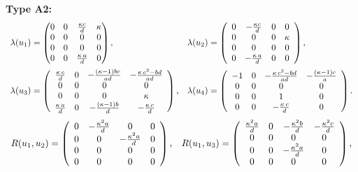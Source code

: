 \documentclass{amsart}
\theoremstyle{plain}
\theoremstyle{remark}
\begin{document}
{\smallskip\noindent
{\bf Type A2:}
{\small \begin{equation}\label{lambdaA2}
\begin{array}{ll}
\lambda(u_1)=\begin{pmatrix}
0 & 0 & \frac{ \kappa c}{d} & \kappa \\ 0 & 0 & 0 & 0 \\ 0 & 0 & 0 & 0 \\ 0 & 0 & \frac{ \kappa\,a}{d}  & 0\end{pmatrix}, &\lambda(u_2)=\left( \begin {array}{cccc} 0&-{\frac {\kappa c}{d}}&0&0\\ 0&0&0&\kappa \\ 0&0&0&0\\0&-{\frac {\kappa \, a}{d}}&0&0\end {array} \right), 
\vspace{2mm}\\
\lambda(u_3)=\left( \begin {array}{cccc} {\frac {\kappa\,c}{d}}&0&-{\frac { \left( \kappa-1 \right) bc}{ad}}&-{\frac {\kappa\,{c}^{2}-bd}{ad}}\\0&0&0&0\\0&0&0&\kappa\\{\frac {\kappa\,a}{d}}&0&-{\frac { \left( \kappa-1 \right) b}{d}}&-{\frac {\kappa\,c}{d}}\end {array} \right), &\lambda(u_4)=\left( \begin {array}{cccc} -1&0&-{\frac {\kappa\,{c}^{2}-bd}{ad}}&-{\frac { \left( \kappa-1 \right) c}{a}}\\0&0&0&0\\0&0&1&0\\0&0&-{\frac {\kappa\,c}{d}}&0\end {array} \right).
\end{array}
\end{equation}
%
\begin{equation}\label{RA2}
\begin{array}{ll}
R(u_1,u_2) =\left( \begin {array}{cccc} 0&-{\frac {{\kappa}^{2}a}{d}}&0&0\\0&0&-{\frac {{\kappa}^{2}a}{d}}&0\\0&0&0&0\\0&0&0&0\end {array} \right), &R(u_1,u_3)=\left( \begin {array}{cccc} {\frac {{\kappa}^{2}a}{d}}&0&-{\frac {\kappa ^2 b}{d}}&-{\frac {{\kappa}^{2}c}{d}}\\0&0&0&0\\0&0&-{\frac {{\kappa}^{2}a}{d}}&0\\0&0&0&0\end {array} \right), \vspace{2mm}\\

\end{array}
\end{equation}}}
\end{document}
